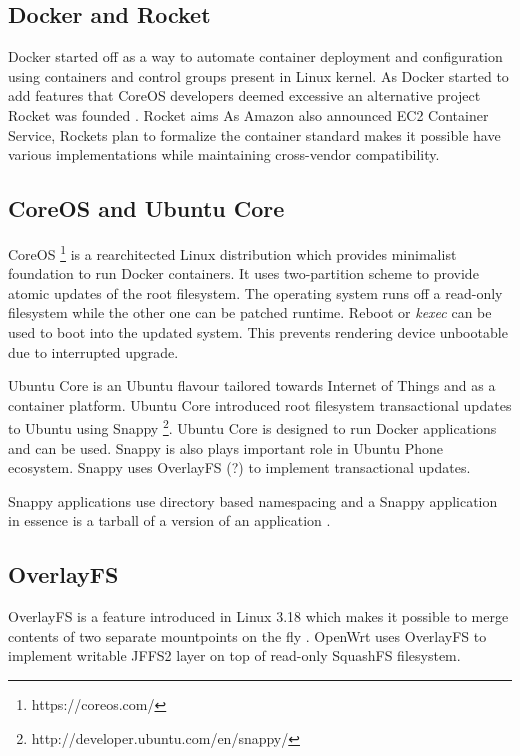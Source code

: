 \documentclass[a4paper,11pt]{kth-mag}
\begin{document}
\subsection{Docker and Rocket}

Docker started off as a way to automate container deployment and
configuration using containers and control groups present in Linux
kernel. As Docker started to add features that CoreOS developers
deemed excessive an alternative project Rocket was founded
\cite{rocket}.
Rocket aims
As Amazon also announced EC2 Container Service,
Rockets plan to formalize the container standard
makes it possible have various implementations while
maintaining cross-vendor compatibility.

\subsection{CoreOS and Ubuntu Core}

CoreOS \footnote{https://coreos.com/} is a rearchitected Linux
distribution which provides minimalist foundation to run Docker containers.
It uses two-partition scheme to provide atomic updates of the root
filesystem. The operating system runs off a read-only filesystem
while the other one can be patched runtime. Reboot or \emph{kexec}
can be used to boot into the updated system. This prevents rendering
device unbootable due to interrupted upgrade.

Ubuntu Core is an Ubuntu flavour tailored towards Internet of Things
and as a container platform. Ubuntu Core introduced root filesystem
transactional updates to Ubuntu using Snappy
\footnote{http://developer.ubuntu.com/en/snappy/}.
Ubuntu Core is designed to run Docker applications and can be used.
Snappy is also plays important role in Ubuntu Phone ecosystem.
Snappy uses OverlayFS (?) to implement transactional updates.

Snappy applications use directory based namespacing
and a Snappy application in essence is a tarball of a version
of an application \cite{ubuntu}.


\subsection{OverlayFS}

OverlayFS is a feature introduced in Linux 3.18 which makes it
possible to merge contents of two separate mountpoints on the fly \cite{overlayfs}.
OpenWrt uses OverlayFS to implement writable JFFS2 layer on top of
read-only SquashFS filesystem.
\end{document}
